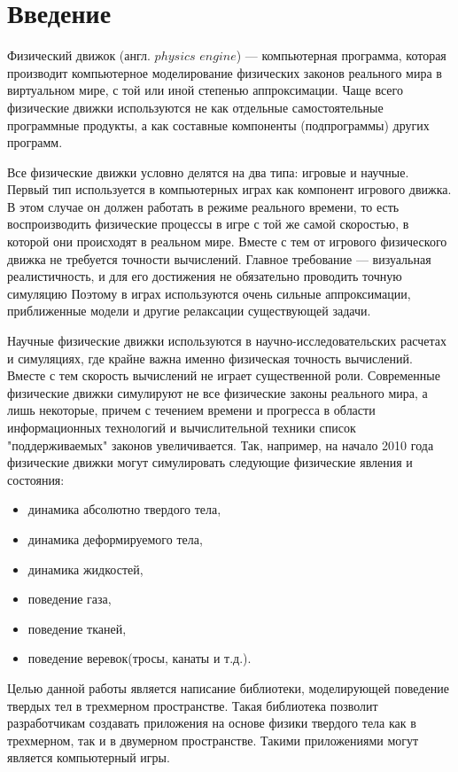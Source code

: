 \chapter*{Введение}

Физический движок (англ. $physics$ $engine$) --- компьютерная программа, которая производит
компьютерное моделирование физических законов реального мира в виртуальном мире,
с той или иной степенью аппроксимации. Чаще всего физические движки используются не как отдельные 
самостоятельные программные продукты, а как составные компоненты (подпрограммы) других программ.

Все физические движки условно делятся на два типа: игровые и научные.
Первый тип используется в компьютерных играх как компонент игрового движка. В этом случае он должен
работать в режиме реального времени, то есть воспроизводить физические процессы в игре с той же самой скоростью,
в которой они происходят в реальном мире. Вместе с тем от игрового физического движка не требуется точности вычислений.
Главное требование — визуальная реалистичность, и для его достижения не обязательно проводить точную симуляцию
Поэтому в играх используются очень сильные аппроксимации, приближенные модели и другие релаксации существующей задачи.

Научные физические движки используются в научно-исследовательских расчетах и симуляциях, где крайне важна
именно физическая точность вычислений. Вместе с тем скорость вычислений не играет существенной роли.
Современные физические движки симулируют не все физические законы реального мира, а лишь некоторые,
причем с течением времени и прогресса в области информационных технологий и вычислительной техники
список "поддерживаемых" законов увеличивается. Так, например, на начало 2010 года физические движки 
могут симулировать следующие физические явления и состояния:
\begin{itemize}
  \item динамика абсолютно твердого тела,
  \item динамика деформируемого тела,
  \item динамика жидкостей,
  \item поведение газа, 
  \item поведение тканей,
  \item поведение веревок(тросы, канаты и т.д.).
\end{itemize}

Целью данной работы является написание библиотеки, моделирующей поведение твердых тел в трехмерном пространстве. 
Такая библиотека позволит разработчикам создавать приложения на основе физики твердого тела как в трехмерном, так и 
в двумерном пространстве. Такими приложениями могут является компьютерный игры.

